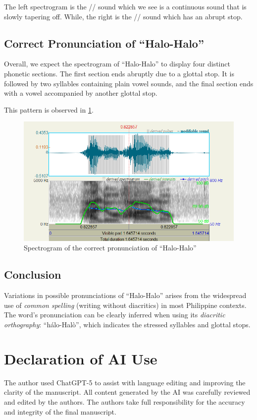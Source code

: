 \documentclass{article}
\begin{document}
The left spectrogram is the // sound which we see is a continuous
sound that is slowly tapering off. While, the right is the // sound
which has an abrupt stop.

\subsection{Correct Pronunciation of ``Halo-Halo''}
Overall, we expect the spectrogram of ``Halo-Halo'' to display four distinct
phonetic sections. The first section ends abruptly due to a glottal stop. It is
followed by two syllables containing plain vowel sounds, and the final section
ends with a vowel accompanied by another glottal stop.

This pattern is observed in \cref{fig:correct}.

\begin{figure}
    \centering
    \includegraphics[width=0.65\linewidth]{img/correct.png}
    \caption{Spectrogram of the correct pronunciation of ``Halo-Halo''}\label{fig:correct}
\end{figure}

\subsection{Conclusion}

Variations in possible pronunciations of ``Halo-Halo'' arises from the
widespread use of \emph{common spelling} (writing without diacritics) in most
Philippine contexts. The word's pronunciation can be clearly inferred when
using its \emph{diacritic orthography}: ``h\'alo-Hal\`o'', which indicates the
stressed syllables and glottal stops.




\section*{Declaration of AI Use}
The author used ChatGPT-5 to assist with language editing and improving the clarity of the manuscript. All content 
generated by the AI was carefully reviewed and edited by the authors. The authors take full responsibility for the 
accuracy and integrity of the final manuscript.
\end{document}
